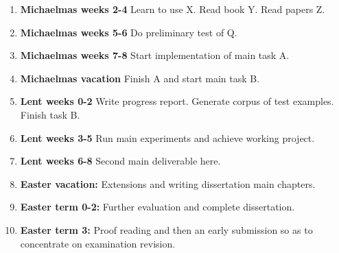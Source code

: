 \begin{enumerate}

\item {\bf Michaelmas weeks 2-4} Learn to use X. Read book Y. Read papers Z.

\item {\bf Michaelmas weeks 5-6} Do preliminary test of Q.

\item {\bf Michaelmas weeks 7-8} Start implementation of main task A.

\item {\bf Michaelmas vacation} Finish A and start main task B.

\item {\bf Lent weeks 0-2} Write progress report. Generate corpus of test examples. Finish task B.  

\item {\bf Lent weeks 3-5} Run main experiments and achieve working project.

\item {\bf Lent weeks 6-8} Second main deliverable here.

\item {\bf Easter vacation:} Extensions and writing dissertation main chapters.

\item {\bf Easter term 0-2:}  Further evaluation and complete dissertation.

\item {\bf Easter term 3:} Proof reading and then an early submission so as to concentrate on examination revision.

\end{enumerate}


 

